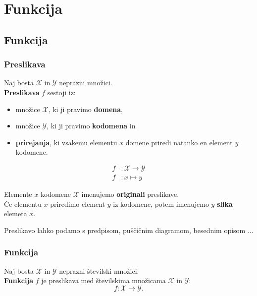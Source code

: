 \chapter{Funkcija}


\section{Funkcija}

    \subsection*{Preslikava}

        Naj bosta $\mathcal{X}$ in $\mathcal{Y}$ neprazni množici. \\
        \textbf{Preslikava} $f$ sestoji iz:
        \begin{itemize}
            \item množice $\mathcal{X}$, ki ji pravimo \textbf{domena},
            \item množice $\mathcal{Y}$, ki ji pravimo \textbf{kodomena} in 
            \item \textbf{prirejanja}, ki vsakemu elementu $x$ domene priredi natanko en element $y$ kodomene.
        \end{itemize}

        $$\begin{aligned}
            f&: \mathcal{X}\to\mathcal{Y} \\ f&: x\mapsto y
        \end{aligned}  $$
    

        Elemente $x$ kodomene $\mathcal{X}$ imenujemo \textbf{originali} preslikave.
        \\ Če elementu $x$ priredimo element $y$ iz kodomene, potem imenujemo $y$ \textbf{slika} elemeta $x$.

        Preslikavo lahko podamo s predpisom, puščičnim diagramom, besednim opisom ...





    \subsection*{Funkcija}

        Naj bosta $\mathcal{X}$ in $\mathcal{Y}$ neprazni številski množici. \\
        \textbf{Funkcija} $f$ je preslikava med številskima množicama $\mathcal{X}$ in $\mathcal{Y}$:
        $$f: \mathcal{X}\to\mathcal{Y}.$$


